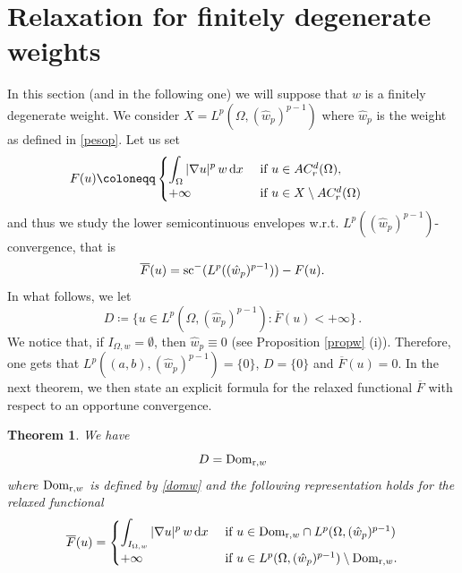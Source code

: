 \documentclass[11pt,leqno]{amsart}
\newtheorem{teo}{Theorem}[section]
\theoremstyle{remark}
\theoremstyle{definition}
\theoremstyle{definition}
\newcommand{\wstar}{{\hat w}}
\def\de{{\rm d}}
\begin{document}
\section{Relaxation for finitely degenerate weights}\label{relaxp}
In this section (and in the following one) we will suppose that   $w$ is a finitely degenerate weight.
We consider $X=L^{p}(\Omega,(\wstar_{p})^{p-1})$ where $\wstar_{p}$ is the weight as defined in \eqref{pesop}. Let us set
\begin{equation*}
\!\!\!\!\!\! \!\!\! \!\!\!\!\!\! \! F(u)\coloneqq
\begin{cases}
\displaystyle\int_{\Omega}|\nabla u|^{p}\,w\,\de x &\text{ if } u\in AC_{r}^{d}(\Omega),\\
+\infty & \text{ if } u\in X\setminus  AC_{r}^{d}(\Omega)
\end{cases}
\end{equation*}
and thus we study the lower semicontinuous envelopes w.r.t.  $L^{p}((\wstar_{p})^{p-1})$-convergence, that is
$$
\overline{F}(u)={\rm sc^-}(L^{p}((\wstar_{p})^{p-1}))-F(u).
$$
In what follows, we let
$$
D\coloneqq\{u\in L^{p}(\Omega,(\wstar_{p})^{p-1}): \overline{F}(u)<+\infty
\}\,.
$$
We notice that, if $I_{\Omega, w}=\emptyset$, then $\wstar_{p}\equiv 0$ (see Proposition \ref{propw} (i)). Therefore, one gets that $L^{p}((a,b),(\wstar_{p})^{p-1})=\{0\}$, $D=\{0\}$ and $\overline{F}(u)=0$. In the next theorem, we then state an explicit formula for the relaxed functional $\overline{F}$ with respect to an opportune convergence.
\begin{teo} \label{mainfinitelocsum} 
We have
\begin{equation*}
D={\rm{Dom}}_{{\mathrm r},w}
\end{equation*}
where ${\rm{Dom}}_{{\mathrm r},w}$ is defined by \eqref{domw}
and the following representation holds for the relaxed functional
\begin{equation*}
\overline{F}(u)=
\begin{cases}
\displaystyle\int_{I_{\Omega, w}} |\nabla u|^{p}\,w\,\de x &\text{ if } u\in {\rm{Dom}}_{{\mathrm r},w}\cap L^{p}(\Omega,(\wstar_{p})^{p-1})\\
+\infty & \text{ if } u\in L^{p}(\Omega,(\wstar_{p})^{p-1})\setminus {\rm{Dom}}_{{\mathrm r},w} .
\end{cases}
\end{equation*}  
\end{teo}
\end{document}
